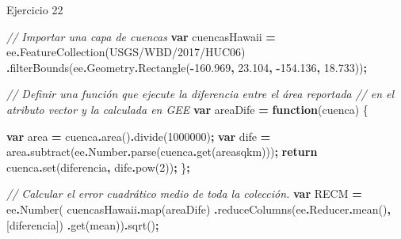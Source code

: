 \documentclass[
  12pt,
  letterpaper,
  twoside]{book}
\newenvironment{Shaded}{\begin{snugshade}}{\end{snugshade}}
\newcommand{\AttributeTok}[1]{\textcolor[rgb]{0.77,0.63,0.00}{#1}}
\newcommand{\CommentTok}[1]{\textcolor[rgb]{0.56,0.35,0.01}{\textit{#1}}}
\newcommand{\ControlFlowTok}[1]{\textcolor[rgb]{0.13,0.29,0.53}{\textbf{#1}}}
\newcommand{\DecValTok}[1]{\textcolor[rgb]{0.00,0.00,0.81}{#1}}
\newcommand{\FloatTok}[1]{\textcolor[rgb]{0.00,0.00,0.81}{#1}}
\newcommand{\FunctionTok}[1]{\textcolor[rgb]{0.00,0.00,0.00}{#1}}
\newcommand{\KeywordTok}[1]{\textcolor[rgb]{0.13,0.29,0.53}{\textbf{#1}}}
\newcommand{\NormalTok}[1]{#1}
\newcommand{\OperatorTok}[1]{\textcolor[rgb]{0.81,0.36,0.00}{\textbf{#1}}}
\newcommand{\StringTok}[1]{\textcolor[rgb]{0.31,0.60,0.02}{#1}}
\begin{document}
Ejercicio 22

\begin{Shaded}
\begin{Highlighting}[]
\CommentTok{// Importar una capa de cuencas}
\KeywordTok{var}\NormalTok{ cuencasHawaii }\OperatorTok{=}\NormalTok{ ee}\OperatorTok{.}\FunctionTok{FeatureCollection}\NormalTok{(}\StringTok{\textquotesingle{}USGS/WBD/2017/HUC06\textquotesingle{}}\NormalTok{)}
  \OperatorTok{.}\FunctionTok{filterBounds}\NormalTok{(ee}\OperatorTok{.}\AttributeTok{Geometry}\OperatorTok{.}\FunctionTok{Rectangle}\NormalTok{(}\OperatorTok{{-}}\FloatTok{160.969}\OperatorTok{,} \FloatTok{23.104}\OperatorTok{,} \OperatorTok{{-}}\FloatTok{154.136}\OperatorTok{,} \FloatTok{18.733}\NormalTok{))}\OperatorTok{;}

\CommentTok{// Definir una función que ejecute la diferencia entre el área reportada }
\CommentTok{// en el atributo vector y la calculada en GEE}
\KeywordTok{var}\NormalTok{ areaDife }\OperatorTok{=} \KeywordTok{function}\NormalTok{(cuenca) \{}
 
  \KeywordTok{var}\NormalTok{ area }\OperatorTok{=}\NormalTok{ cuenca}\OperatorTok{.}\FunctionTok{area}\NormalTok{()}\OperatorTok{.}\FunctionTok{divide}\NormalTok{(}\DecValTok{1000000}\NormalTok{)}\OperatorTok{;}
  \KeywordTok{var}\NormalTok{ dife }\OperatorTok{=}\NormalTok{ area}\OperatorTok{.}\FunctionTok{subtract}\NormalTok{(ee}\OperatorTok{.}\AttributeTok{Number}\OperatorTok{.}\FunctionTok{parse}\NormalTok{(cuenca}\OperatorTok{.}\FunctionTok{get}\NormalTok{(}\StringTok{\textquotesingle{}areasqkm\textquotesingle{}}\NormalTok{)))}\OperatorTok{;}
  \ControlFlowTok{return}\NormalTok{ cuenca}\OperatorTok{.}\FunctionTok{set}\NormalTok{(}\StringTok{\textquotesingle{}diferencia\textquotesingle{}}\OperatorTok{,}\NormalTok{ dife}\OperatorTok{.}\FunctionTok{pow}\NormalTok{(}\DecValTok{2}\NormalTok{))}\OperatorTok{;}
\NormalTok{\}}\OperatorTok{;}

\CommentTok{// Calcular el error cuadrático medio de toda la colección.}
\KeywordTok{var}\NormalTok{ RECM }\OperatorTok{=}\NormalTok{ ee}\OperatorTok{.}\FunctionTok{Number}\NormalTok{(}
\NormalTok{  cuencasHawaii}\OperatorTok{.}\FunctionTok{map}\NormalTok{(areaDife)}
  \OperatorTok{.}\FunctionTok{reduceColumns}\NormalTok{(ee}\OperatorTok{.}\AttributeTok{Reducer}\OperatorTok{.}\FunctionTok{mean}\NormalTok{()}\OperatorTok{,}\NormalTok{ [}\StringTok{\textquotesingle{}diferencia\textquotesingle{}}\NormalTok{])}
  \OperatorTok{.}\FunctionTok{get}\NormalTok{(}\StringTok{\textquotesingle{}mean\textquotesingle{}}\NormalTok{))}\OperatorTok{.}\FunctionTok{sqrt}\NormalTok{()}\OperatorTok{;}
\end{Highlighting}
\end{Shaded}
\end{document}

